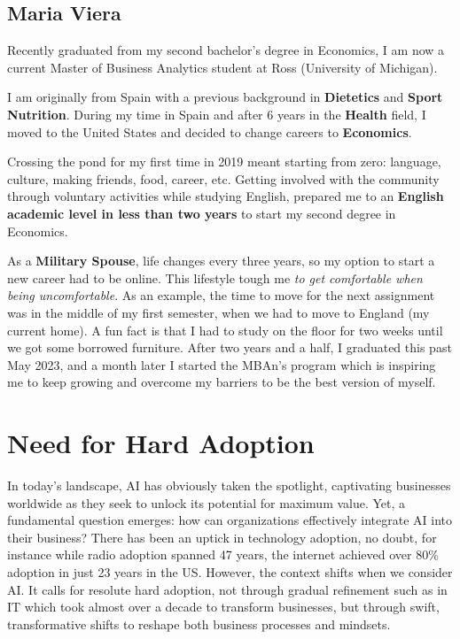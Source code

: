 \documentclass[
]{article}
\begin{document}
\hypertarget{maria-viera}{%
\subsection{Maria Viera}\label{maria-viera}}

Recently graduated from my second bachelor's degree in Economics, I am now a current Master of Business Analytics student at Ross (University of Michigan).

I am originally from Spain with a previous background in \textbf{Dietetics} and \textbf{Sport Nutrition}. During my time in Spain and after 6 years in the \textbf{Health} field, I moved to the United States and decided to change careers to \textbf{Economics}.

Crossing the pond for my first time in 2019 meant starting from zero: language, culture, making friends, food, career, etc. Getting involved with the community through voluntary activities while studying English, prepared me to an \textbf{English academic level in less than two years} to start my second degree in Economics.

As a \textbf{Military Spouse}, life changes every three years, so my option to start a new career had to be online. This lifestyle tough me \emph{to get comfortable when being uncomfortable}. As an example, the time to move for the next assignment was in the middle of my first semester, when we had to move to England (my current home). A fun fact is that I had to study on the floor for two weeks until we got some borrowed furniture. After two years and a half, I graduated this past May 2023, and a month later I started the MBAn's program which is inspiring me to keep growing and overcome my barriers to be the best version of myself.

\hypertarget{need-for-hard-adoption}{%
\section{Need for Hard Adoption}\label{need-for-hard-adoption}}

In today's landscape, AI has obviously taken the spotlight, captivating businesses worldwide as they seek to unlock its potential for maximum value. Yet, a fundamental question emerges: how can organizations effectively integrate AI into their business? There has been an uptick in technology adoption, no doubt, for instance while radio adoption spanned 47 years, the internet achieved over 80\% adoption in just 23 years in the US. However, the context shifts when we consider AI. It calls for resolute hard adoption, not through gradual refinement such as in IT which took almost over a decade to transform businesses, but through swift, transformative shifts to reshape both business processes and mindsets.
\end{document}

